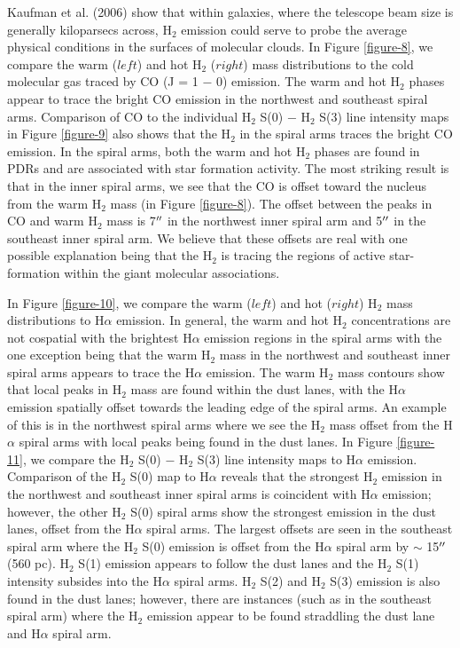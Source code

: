 \documentclass[manuscript]{aastex}
\begin{document}
Kaufman et al. (2006) show that within galaxies, where the
telescope beam size is generally kiloparsecs across, H$_2$
emission could serve to probe the average physical 
conditions in the surfaces of molecular clouds.  In Figure 
\ref{figure-8}, we compare the warm ($left$) and hot
H$_2$ ($right$) mass distributions to the cold molecular 
gas traced by CO (J = 1 $-$ 0) emission.  The warm and hot 
H$_2$ phases appear to trace the bright CO emission
in the northwest and southeast spiral arms. Comparison 
of CO to the individual H$_2$  S(0) $-$ H$_2$ S(3) line intensity 
maps in Figure \ref{figure-9} also shows that the H$_2$ in 
the spiral arms traces the bright CO emission.  
In the spiral arms, both the warm and hot H$_2$ 
phases are found in PDRs and are associated 
with star formation activity.  The most 
striking result is that in the inner spiral arms, we see that the
CO is offset toward the nucleus from the 
warm H$_2$ mass (in Figure \ref{figure-8}).
The offset between the peaks in CO and warm H$_2$ mass is
7$\mbox{$^{\prime\prime}$}$ in the northwest inner spiral arm and 5$\mbox{$^{\prime\prime}$}$ in the
southeast inner spiral arm.  We believe that these offsets are real with
one possible explanation being that the H$_2$ is tracing the
regions of active star-formation within the giant molecular
associations.  

In Figure \ref{figure-10}, we compare the warm ($left$) and hot ($right$)
H$_2$ mass distributions to H$\alpha$ emission.  In general,
the warm and hot H$_2$ concentrations are not cospatial with
the brightest H$\alpha$ emission regions in the spiral arms with the one
exception being that the warm H$_2$ mass in 
the northwest and southeast inner spiral
arms appears to trace the H$\alpha$ emission.  The warm H$_2$
mass contours show that local peaks in H$_2$ mass are found
within the dust lanes, with the H$\alpha$ emission spatially 
offset towards the leading edge of the spiral arms.  
An example of this is in the northwest spiral
arms where we see the H$_2$ mass offset from the H$\alpha$
spiral arms with local peaks being found in the dust lanes.
In Figure \ref{figure-11}, we compare the H$_2$ S(0) $-$
H$_2$ S(3) line intensity maps to H$\alpha$ emission.
Comparison of the H$_2$ S(0) map to H$\alpha$ reveals that
the strongest H$_2$ emission in the northwest and southeast
inner spiral arms is coincident with H$\alpha$ emission; however, the
other H$_2$ S(0) spiral arms show the strongest emission in
the dust lanes, offset from the H$\alpha$ spiral arms.  The largest
offsets are seen in the southeast spiral arm where the H$_2$
S(0) emission is offset from the H$\alpha$ spiral arm by $\sim$
15$\mbox{$^{\prime\prime}$}$ (560 pc).  H$_2$ S(1) emission appears to follow
the dust lanes and the H$_2$ S(1) intensity subsides into the
H$\alpha$ spiral arms.  H$_2$ S(2) and H$_2$ S(3)
emission is also found in the dust lanes; however, there are instances
(such as in the southeast spiral arm) where the H$_2$
emission appear to be found straddling the dust lane and H$\alpha$
spiral arm.
\end{document}
